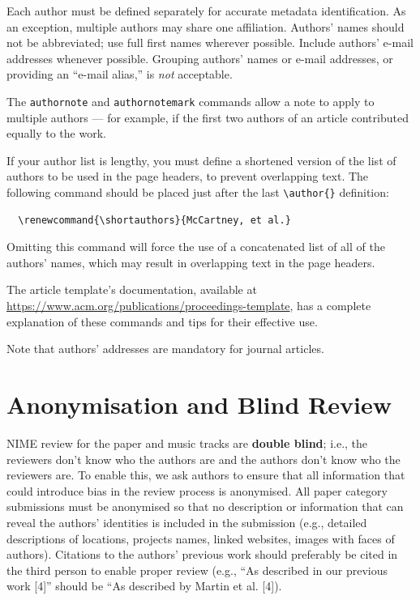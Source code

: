 \documentclass[sigconf]{nimeart}
\begin{document}
Each author must be defined separately for accurate metadata
identification.  As an exception, multiple authors may share one
affiliation. Authors' names should not be abbreviated; use full first
names wherever possible. Include authors' e-mail addresses whenever
possible. Grouping authors' names or e-mail addresses, or providing an ``e-mail
alias,'' is \emph{not} acceptable.

The \verb|authornote| and \verb|authornotemark| commands allow a note
to apply to multiple authors --- for example, if the first two authors
of an article contributed equally to the work.

If your author list is lengthy, you must define a shortened version of
the list of authors to be used in the page headers, to prevent
overlapping text. The following command should be placed just after
the last \verb|\author{}| definition:
\begin{verbatim}
  \renewcommand{\shortauthors}{McCartney, et al.}
\end{verbatim}
Omitting this command will force the use of a concatenated list of all
of the authors' names, which may result in overlapping text in the
page headers.

The article template's documentation, available at
\url{https://www.acm.org/publications/proceedings-template}, has a
complete explanation of these commands and tips for their effective
use.

Note that authors' addresses are mandatory for journal articles.

\section{Anonymisation and Blind Review}

NIME review for the paper and music tracks are \textbf{double blind}; i.e., the reviewers don’t know who the authors are and the authors don’t know who the reviewers are. 
To enable this, we ask authors to ensure that all information that could introduce bias in the review process is anonymised.
All paper category submissions must be anonymised so that no description or information that can reveal the authors’ identities is included in the submission (e.g., detailed descriptions of locations, projects names, linked websites, images with faces of authors). Citations to the authors’ previous work should preferably be cited in the third person to enable proper review (e.g., “As described in our previous work [4]” should be “As described by Martin et al. [4]). 
\end{document}
